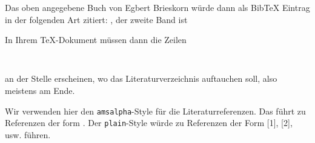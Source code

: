 Das oben angegebene Buch von Egbert Brieskorn würde dann als BibTeX Eintrag in der folgenden Art zitiert: \cite{Brieskorn1983a}, der zweite Band ist \cite{Brieskorn1983b}

In Ihrem \TeX-Dokument müssen dann die Zeilen
\begin{verbatim}


\end{verbatim}
an der Stelle erscheinen, wo das Literaturverzeichnis auftauchen soll, also meistens am Ende. 

Wir verwenden hier den \texttt{amsalpha}-Style für die Literaturreferenzen. Das führt zu Referenzen der form \cite{Raymond:2014uha}. Der \texttt{plain}-Style würde zu Referenzen der Form [1], [2], usw. führen.
